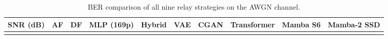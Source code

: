 \begin{longtable}[]{@{}
  >{\raggedright\arraybackslash}p{}
  >{\raggedright\arraybackslash}p{}
  >{\raggedright\arraybackslash}p{}
  >{\raggedright\arraybackslash}p{}
  >{\raggedright\arraybackslash}p{}
  >{\raggedright\arraybackslash}p{}
  >{\raggedright\arraybackslash}p{}
  >{\raggedright\arraybackslash}p{}
  >{\raggedright\arraybackslash}p{}
  >{\raggedright\arraybackslash}p{}@{}}
\caption{BER comparison of all nine relay strategies on the AWGN channel.}\label{tbl:table1}\tabularnewline
\toprule\noalign{}
\begin{minipage}[b]{\linewidth}\raggedright
SNR (dB)
\end{minipage} & \begin{minipage}[b]{\linewidth}\raggedright
AF
\end{minipage} & \begin{minipage}[b]{\linewidth}\raggedright
DF
\end{minipage} & \begin{minipage}[b]{\linewidth}\raggedright
MLP (169p)
\end{minipage} & \begin{minipage}[b]{\linewidth}\raggedright
Hybrid
\end{minipage} & \begin{minipage}[b]{\linewidth}\raggedright
VAE
\end{minipage} & \begin{minipage}[b]{\linewidth}\raggedright
CGAN
\end{minipage} & \begin{minipage}[b]{\linewidth}\raggedright
Transformer
\end{minipage} & \begin{minipage}[b]{\linewidth}\raggedright
Mamba S6
\end{minipage} & \begin{minipage}[b]{\linewidth}\raggedright
Mamba-2 SSD
\end{minipage} \\
\midrule\noalign{}
\endfirsthead
\toprule\noalign{}
\begin{minipage}[b]{\linewidth}\raggedright

\end{minipage}
\end{longtable}
